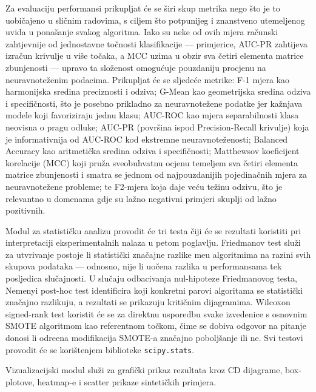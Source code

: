 Za evaluaciju performansi prikupljat \'{c}e se \v{s}iri skup metrika
nego \v{s}to je to uobi\v{c}ajeno u sli\v{c}nim radovima, s ciljem
\v{s}to potpunijeg i znanstveno utemeljenog uvida u pona\v{s}anje
svakog algoritma. Iako su neke od ovih mjera ra\v{c}unski zahtjevnije
od jednostavne to\v{c}nosti klasifikacije --- primjerice, AUC-PR zahtijeva
izra\v{c}un krivulje u vi\v{s}e to\v{c}aka, a MCC uzima u obzir sva
\v{c}etiri elementa matrice zbunjenosti --- upravo ta slo\v{z}enost
omogu\'{c}uje pouzdaniju procjenu na neuravnote\v{z}enim podacima.
Prikupljat \'{c}e se sljede\'{c}e metrike:
F-1 mjera kao harmonijska sredina preciznosti i odziva; G-Mean kao
geometrijska sredina odziva i specifi\v{c}nosti, \v{s}to je posebno
prikladno za neuravnote\v{z}ene podatke jer ka\v{z}njava modele koji
favoriziraju jednu klasu; AUC-ROC kao mjera separabilnosti klasa neovisna
o pragu odluke; AUC-PR (povr\v{s}ina ispod Precision-Recall krivulje)
koja je informativnija od AUC-ROC kod ekstremne neuravnote\v{z}enosti;
Balanced Accuracy kao aritmeti\v{c}ka sredina odziva i specifi\v{c}nosti;
Matthewsov koeficijent korelacije (MCC) koji pru\v{z}a sveobuhvatnu ocjenu
temeljem sva \v{c}etiri elementa matrice zbunjenosti i smatra se jednom od
najpouzdanijih pojedina\v{c}nih mjera za neuravnote\v{z}ene probleme; te
F2-mjera koja daje ve\'{c}u te\v{z}inu odzivu, \v{s}to je relevantno u
domenama gdje su la\v{z}no negativni primjeri skuplji od la\v{z}no
pozitivnih.

Modul za statisti\v{c}ku analizu provodit \'{c}e tri testa \v{c}iji
\'{c}e se rezultati koristiti pri interpretaciji eksperimentalnih
nalaza u petom poglavlju. Friedmanov test \cite{demsar2006} slu\v{z}i za
utvr\dj{}ivanje postoje li statisti\v{c}ki zna\v{c}ajne razlike me\dj{}u
algoritmima na razini svih skupova podataka --- odnosno, nije li uo\v{c}ena
razlika u performansama tek posljedica slu\v{c}ajnosti. U slu\v{c}aju
odbacivanja nul-hipoteze Friedmanovog testa, Nemenyi post-hoc test
identificira koji konkretni parovi algoritama se statisti\v{c}ki
zna\v{c}ajno razlikuju, a rezultati se prikazuju kriti\v{c}nim
dijagramima. Wilcoxon signed-rank test koristit \'{c}e se za direktnu
usporedbu svake izvedenice s osnovnim SMOTE algoritmom kao referentnom
to\v{c}kom, \v{c}ime se dobiva odgovor na pitanje donosi li odre\dj{}ena
modifikacija SMOTE-a zna\v{c}ajno pobolj\v{s}anje ili ne. Svi testovi
provodit \'{c}e se kori\v{s}tenjem biblioteke \texttt{scipy.stats}.

Vizualizacijski modul slu\v{z}i za grafi\v{c}ki prikaz rezultata kroz
CD dijagrame, box-plotove, heatmap-e i scatter prikaze sinteti\v{c}kih
primjera.

